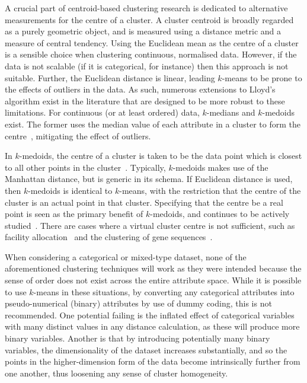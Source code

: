 A crucial part of centroid-based clustering research is dedicated to alternative
measurements for the centre of a cluster. A cluster centroid is broadly regarded
as a purely geometric object, and is measured using a distance metric and a
measure of central tendency. Using the Euclidean mean as the centre of a cluster
is a sensible choice when clustering continuous, normalised data. However, if
the data is not scalable (if it is categorical, for instance) then this approach
is not suitable. Further, the Euclidean distance is linear, leading \(k\)-means
to be prone to the effects of outliers in the data. As such, numerous
extensions to Lloyd's algorithm exist in the literature that are designed to be
more robust to these limitations. For continuous (or at least ordered) data,
\(k\)-medians and \(k\)-medoids exist. The former uses the median value of each
attribute in a cluster to form the centre~\cite{Arya2001,Bradley1997},
mitigating the effect of outliers.

In \(k\)-medoids, the centre of a cluster is taken to be the data point which is
closest to all other points in the cluster~\cite{Kaufman1987}.  Typically,
\(k\)-medoids makes use of the Manhattan distance, but is generic in its schema.
If Euclidean distance is used, then \(k\)-medoids is identical to \(k\)-means,
with the restriction that the centre of the cluster is an actual point in that
cluster. Specifying that the centre be a real point is seen as the primary
benefit of \(k\)-medoids, and continues to be actively
studied~\cite{Schubert2019,Ushakov2021}. There are cases where a virtual cluster
centre is not sufficient, such as facility
allocation~\cite{Chen2016clustering,Wang2020} and the clustering of gene
sequences~\cite{Johnson2018}.

When considering a categorical or mixed-type dataset, none of the aforementioned
clustering techniques will work as they were intended because the sense of order
does not exist across the entire attribute space. While it is possible to use
\(k\)-means in these situations, by converting any categorical attributes into
pseudo-numerical (binary) attributes by use of dummy coding, this is not
recommended. One potential failing is the inflated effect of categorical
variables with many distinct values in any distance calculation, as these will
produce more binary variables. Another is that by introducing potentially many
binary variables, the dimensionality of the dataset increases substantially, and
so the points in the higher-dimension form of the data become intrinsically
further from one another, thus loosening any sense of cluster homogeneity.

